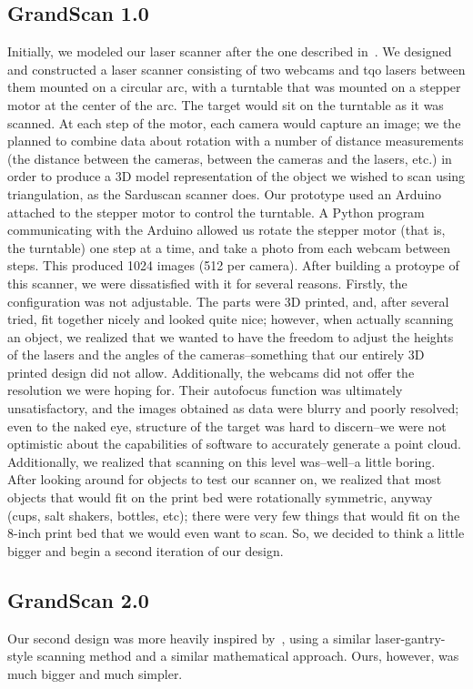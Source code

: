 \documentclass[12pt, letterpaper]{article}
\begin{document}
\subsection{GrandScan 1.0}
Initially, we modeled our laser scanner after
the one described in~\cite{sardau}. We designed and constructed a laser scanner consisting of  two webcams and tqo
lasers between them mounted on a circular arc, with a turntable that was mounted on a stepper motor
at the center of the arc. The target would sit on the turntable as it was scanned. At each step of the motor, each camera would capture
an image; we the planned to combine data about rotation with a number of distance
measurements (the distance between the cameras, between the cameras and the lasers, etc.)
in order to produce a 3D model representation of the object we wished to scan using triangulation, as the Sarduscan scanner does. Our prototype used
an Arduino attached to the stepper motor to control the turntable. A Python program
communicating with the Arduino allowed us rotate the stepper motor (that is, the turntable)
one step at a time, and take a photo from each webcam between steps. This produced
1024 images (512 per camera).
After building a protoype of this scanner, we were dissatisfied with it for several reasons.
Firstly, the configuration was not adjustable. The parts were 3D printed, and, after several tried, fit together nicely and looked quite nice; however, when actually scanning an object, we realized that we wanted to have the freedom to adjust the heights of the lasers and the angles of the cameras--something that our entirely 3D printed design did not allow.
Additionally, the webcams did not offer the resolution we were hoping for. Their autofocus function was ultimately unsatisfactory, and the images obtained as data were blurry and poorly resolved; even to the naked eye, structure of the target was hard to discern--we were not optimistic about the capabilities of software to accurately generate a point cloud.
Additionally, we realized that scanning on this level was--well--a little boring. After looking around for objects to test our scanner on, we realized that most objects that would fit on the print bed were rotationally symmetric, anyway (cups, salt shakers, bottles, etc); there were very few things that would fit on the 8-inch print bed that we would even want to scan. So, we decided to think a little bigger and begin a second iteration of our design.

\subsection{GrandScan 2.0}
Our second design was more heavily inspired by~\cite{dentroman}, using a similar laser-gantry-style scanning method and a similar mathematical approach. Ours, however, was much bigger and much simpler.
\end{document}
